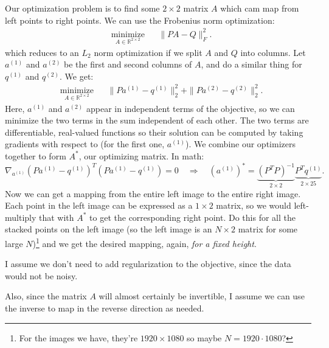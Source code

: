 \documentclass[10pt,twoside]{book}
\newcommand{\mR}{\mathbb{R}}
\begin{document}
Our optimization problem is to find some $2\times 2$ matrix $A$ which cam map
from left points to right points. We can use the Frobenius norm optimization:
\begin{equation*}
\begin{aligned}
& \underset{A \in \mR^{2\times 2}}{\text{minimize}}
& & \|PA - Q\|_F^2.
\end{aligned}
\end{equation*}
which reduces to an $L_2$ norm optimization if we split $A$ and $Q$ into
columns. Let $a^{(1)}$ and $a^{(2)}$ be the first and second columns of $A$, and
do a similar thing for $q^{(1)}$ and $q^{(2)}$. We get:
\begin{equation*}
\begin{aligned}
& \underset{A \in \mR^{2\times 2}}{\text{minimize}}
& & \|Pa^{(1)} - q^{(1)}\|_2^2 + \|Pa^{(2)} - q^{(2)}\|_2^2.
\end{aligned}
\end{equation*}
Here, $a^{(1)}$ and $a^{(2)}$ appear in independent terms of the objective, so
we can minimize the two terms in the sum independent of each other. The two
terms are differentiable, real-valued functions so their solution can be
computed by taking gradients with respect to (for the first one, $a^{(1)}$). We
combine our optimizers together to form $A^*$, our optimizing matrix. In math:
\begin{equation}
\nabla_{a^{(1)}} (Pa^{(1)} - q^{(1)})^T(Pa^{(1)} - q^{(1)}) = 0 \quad \Rightarrow \quad
(a^{(1)})^* = \underbrace{(P^TP)^{-1}}_{2\times 2}\underbrace{P^Tq^{(1)}}_{2\times 25}.
\end{equation}
Now we can get a mapping from the entire left image to the entire right image.
Each point in the left image can be expressed as a $1 \times 2$ matrix, so we
would left-multiply that with $A^*$ to get the corresponding right point. Do
this for all the stacked points on the left image (so the left image is an $N
\times 2$ matrix for some large $N$)\footnote{For the images we have, they're
$1920 \times 1080$ so maybe $N = 1920 \cdot 1080$?} and we get the desired
mapping, again, \emph{for a fixed height}.

I assume we don't need to add regularization to the objective, since the data
would not be noisy.

Also, since the matrix $A$ will almost certainly be invertible, I assume we can
use the inverse to map in the reverse direction as needed.
\end{document}
